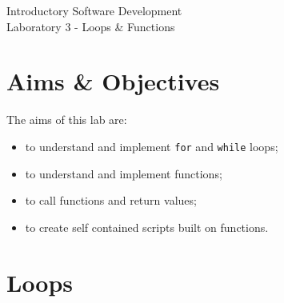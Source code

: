 \documentclass[12pt,oneside]{cttutorial}
\begin{document}
\tutorialextra{}


 

\newcommand{\alert}[1]
{\marginpar
  {\makebox[0 pt][l]
    {\texttt{[image: ../../Figures/png/warning.png]}
  }
  \parbox{2 cm}{{\sffamily \bfseries \tiny #1}}}}


\renewcommand{\baselinestretch}{1.5}
\textwidth=15cm

\newcommand{\I}{j}

\begin{center}
\begin{bfseries}
Introductory Software Development\\Laboratory 3 - Loops \& Functions
\end{bfseries}
\end{center}

\section{Aims \& Objectives}

The aims of this lab are:

\begin{itemize}
\item to understand and implement \lstinline!for! and \lstinline!while! loops;
\item to understand and implement functions;
\item to call functions and return values;
\item to create self contained scripts built on functions.
\end{itemize}

\section{Loops}
\end{document}
